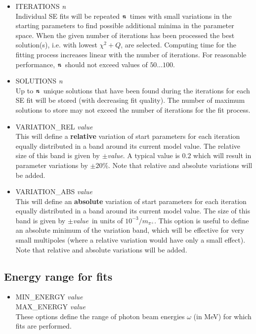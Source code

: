 \documentclass[a4paper,10pt]{article}
\def\enn{\mbox{\ttfamily\textit{n}\rmfamily}}
\def\tt{\ttfamily}
\def\rm{\rmfamily}
\begin{document}
\begin{itemize}
\item
\tt ITERATIONS \textit{n}\rm\\
Individual SE fits will be repeated $\enn$ times with small variations in the starting parameters to find possible additional
minima in the parameter space. When the given number of iterations has been processed the best solution(s), i.e.
with lowest $\chi^2+Q$, are selected. Computing time for the fitting process increases linear with the number of iterations.
For reasonable performance, $\enn$ should not exceed values of $50...100$.

\item
\tt SOLUTIONS \textit{n}\rm\\
Up to $\enn$ unique solutions that have been found during the iterations for each SE fit will be stored (with decreasing fit quality).
The number of maximum solutions to store may not exceed the number of iterations for the fit process.

\item
\tt VARIATION\_REL \textit{value}\rm\\
This will define a \textbf{relative} variation of start parameters for each iteration equally distributed
in a band around its current model value. The relative size of this band is given by $\pm$\tt\textit{value}\rm. A typical value
is $0.2$ which will result in parameter variations by $\pm20\%$.  Note that relative and absolute variations will be added.

\item
\tt VARIATION\_ABS \textit{value}\rm\\
This will define an \textbf{absolute} variation of start parameters for each iteration equally distributed
in a band around its current model value. The size of this band is given by $\pm$\tt\textit{value}\rm\ in units of $10^{-3}/m_{\pi^+}$.
This option is useful to define an absolute minimum of the variation band, which will be effective for very small
multipoles (where a relative variation would have only a small effect). Note that relative and absolute variations will be added.
\end{itemize}

\subsection{Energy range for fits}

\begin{itemize}
\item
\tt MIN\_ENERGY \textit{value}\rm\\
\tt MAX\_ENERGY \textit{value}\rm\\
These options define the range of photon beam energies $\omega$ (in MeV) for which fits are performed.
\end{itemize}
\end{document}
